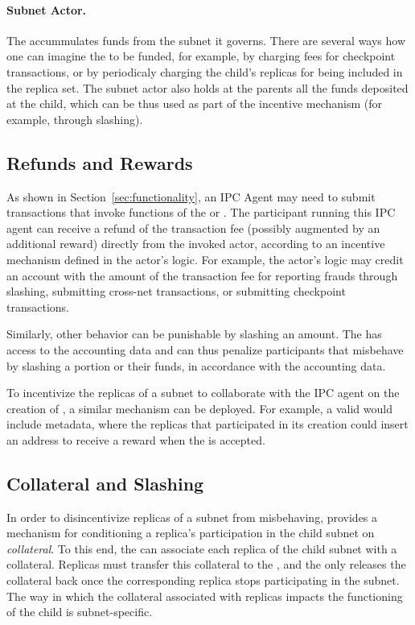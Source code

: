 \paragraph{Subnet Actor.}
The \sa accummulates funds from the subnet it governs.
There are several ways how one can imagine the \sa to be funded,
for example, by charging fees for checkpoint transactions,
or by periodicaly charging the child's replicas for being included in the replica set. The subnet actor also holds at the parents all the funds deposited at the child, which can be thus used as part of the incentive mechanism (for example, through slashing).

\subsection{Refunds and Rewards}

As shown in Section~\ref{sec:functionality}, an IPC Agent may need to submit transactions that invoke functions of the \gw or \sa. The participant running this IPC agent can receive a refund of the transaction fee (possibly augmented by an additional reward) directly from the invoked actor, according to an incentive mechanism defined in the actor's logic. For example, the actor's logic may credit an account with the amount of the transaction fee for reporting frauds through slashing, submitting cross-net transactions, or submitting checkpoint transactions. 

Similarly, other behavior can be punishable by slashing an amount. The \sa has access to the accounting data and can thus penalize participants that misbehave by slashing a portion or their funds, in accordance with the accounting data. 

To incentivize the replicas of a subnet to collaborate with the IPC agent on the creation of \pofsFull, a similar mechanism can be deployed.
For example, a valid \pof would include metadata, where the replicas that participated in its creation could insert an address to receive a reward when the \pof is accepted.

\subsection{Collateral and Slashing}
\label{sec:incentives-collateral-slashing}

In order to disincentivize replicas of a subnet from misbehaving, \ipc provides a mechanism for conditioning a replica's participation in the child subnet on \emph{collateral}.
To this end, the \sa can associate each replica of the child subnet with a collateral.
Replicas must transfer this collateral to the \sa, and the \sa only releases the collateral back once the corresponding replica stops participating in the subnet. The way in which the collateral associated with replicas impacts the functioning of the child is subnet-specific.

